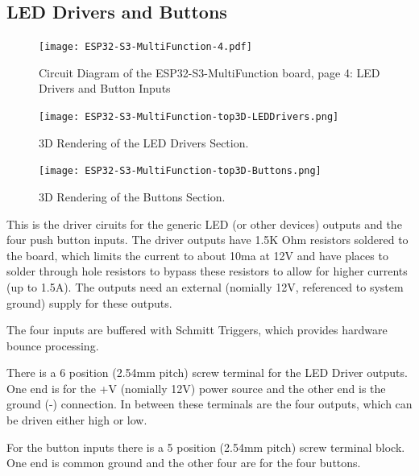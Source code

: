 \subsection{LED Drivers and Buttons}
\begin{figure}[hbpt]\begin{centering}%
\texttt{[image: ESP32-S3-MultiFunction-4.pdf]}
\caption{Circuit Diagram of the ESP32-S3-MultiFunction board, page 4: LED 
Drivers and Button Inputs}
\end{centering}\end{figure}
\begin{figure}[hbpt]\begin{centering}%
\begin{minipage}{.45\textwidth}
  \centering
  \texttt{[image: ESP32-S3-MultiFunction-top3D-LEDDrivers.png]}
  \caption{3D Rendering of the LED Drivers Section.}
  \label{fig:ESP32-S3-MultiFunction-top3D-LEDDrivers}
\end{minipage}
\begin{minipage}{.45\textwidth}
  \centering
  \texttt{[image: ESP32-S3-MultiFunction-top3D-Buttons.png]}
  \caption{3D Rendering of the Buttons Section.}
  \label{fig:ESP32-S3-MultiFunction-top3D-Buttons}
\end{minipage}\end{centering}\end{figure}

This is the driver ciruits for the generic LED (or other devices) outputs and
the four push button inputs. The driver outputs have 1.5K Ohm resistors
soldered to the board, which limits the current to about 10ma at 12V and have
places to solder through hole resistors to bypass these resistors to allow for
higher currents (up to 1.5A). The outputs need an external (nomially 12V,
referenced to system ground) supply for these outputs.

The four inputs are buffered with Schmitt Triggers, which provides hardware 
bounce processing.

There is a 6 position (2.54mm pitch) screw terminal for the LED Driver 
outputs.  One end is for the +V (nomially 12V) power source and the other end 
is the ground (-) connection.  In between these terminals are the four 
outputs, which can be driven either high or low.

For the button inputs there is a 5 position (2.54mm pitch) screw terminal 
block. One end is common ground and the other four are for the four buttons.

